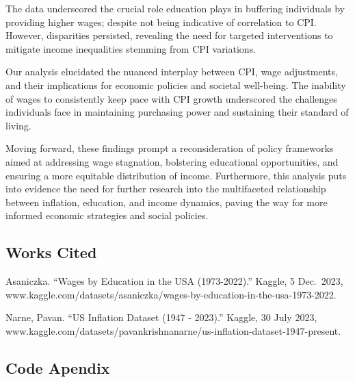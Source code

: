 \documentclass[
  letterpaper,
  DIV=11,
  numbers=noendperiod]{scrartcl}
\begin{document}
The data underscored the crucial role education plays in buffering
individuals by providing higher wages; despite not being indicative of
correlation to CPI. However, disparities persisted, revealing the need
for targeted interventions to mitigate income inequalities stemming from
CPI variations.

Our analysis elucidated the nuanced interplay between CPI, wage
adjustments, and their implications for economic policies and societal
well-being. The inability of wages to consistently keep pace with CPI
growth underscored the challenges individuals face in maintaining
purchasing power and sustaining their standard of living.

Moving forward, these findings prompt a reconsideration of policy
frameworks aimed at addressing wage stagnation, bolstering educational
opportunities, and ensuring a more equitable distribution of income.
Furthermore, this analysis puts into evidence the need for further
research into the multifaceted relationship between inflation,
education, and income dynamics, paving the way for more informed
economic strategies and social policies.

\hypertarget{works-cited}{%
\subsection{Works Cited}\label{works-cited}}

Asaniczka. ``Wages by Education in the USA (1973-2022).'' Kaggle, 5
Dec.~2023,
www.kaggle.com/datasets/asaniczka/wages-by-education-in-the-usa-1973-2022.

Narne, Pavan. ``US Inflation Dataset (1947 - 2023).'' Kaggle, 30 July
2023,
www.kaggle.com/datasets/pavankrishnanarne/us-inflation-dataset-1947-present.

\hypertarget{code-apendix}{%
\subsection{Code Apendix}\label{code-apendix}}
\end{document}
